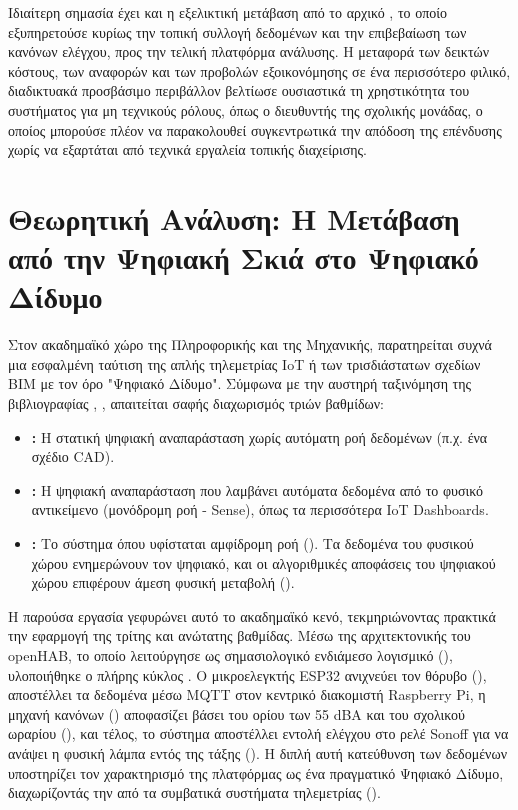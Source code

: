 Ιδιαίτερη σημασία έχει και η εξελικτική μετάβαση από το αρχικό , το οποίο εξυπηρετούσε κυρίως την τοπική συλλογή δεδομένων και την επιβεβαίωση των κανόνων ελέγχου, προς την τελική  πλατφόρμα ανάλυσης. Η μεταφορά των δεικτών κόστους, των αναφορών  και των προβολών εξοικονόμησης σε ένα περισσότερο φιλικό, διαδικτυακά προσβάσιμο περιβάλλον βελτίωσε ουσιαστικά τη χρηστικότητα του συστήματος για μη τεχνικούς ρόλους, όπως ο διευθυντής της σχολικής μονάδας, ο οποίος μπορούσε πλέον να παρακολουθεί συγκεντρωτικά την απόδοση της επένδυσης χωρίς να εξαρτάται από τεχνικά εργαλεία τοπικής διαχείρισης.

\section{Θεωρητική Ανάλυση: Η Μετάβαση από την Ψηφιακή Σκιά στο Ψηφιακό Δίδυμο}
Στον ακαδημαϊκό χώρο της Πληροφορικής και της Μηχανικής, παρατηρείται συχνά μια εσφαλμένη ταύτιση της απλής τηλεμετρίας IoT ή των τρισδιάστατων σχεδίων BIM με τον όρο "Ψηφιακό Δίδυμο". Σύμφωνα με την αυστηρή ταξινόμηση της βιβλιογραφίας \cite{Kritzinger2018}, \cite{Han2022}, απαιτείται σαφής διαχωρισμός τριών βαθμίδων:
\begin{itemize}
\item \textbf{:} Η στατική ψηφιακή αναπαράσταση χωρίς αυτόματη ροή δεδομένων (π.χ. ένα σχέδιο CAD).
\item \textbf{:} Η ψηφιακή αναπαράσταση που λαμβάνει αυτόματα δεδομένα από το φυσικό αντικείμενο (μονόδρομη ροή - Sense), όπως τα περισσότερα IoT Dashboards.
\item \textbf{:} Το σύστημα όπου υφίσταται αμφίδρομη ροή (). Τα δεδομένα του φυσικού χώρου ενημερώνουν τον ψηφιακό, και οι αλγοριθμικές αποφάσεις του ψηφιακού χώρου επιφέρουν άμεση φυσική μεταβολή ().
\end{itemize}

Η παρούσα εργασία γεφυρώνει αυτό το ακαδημαϊκό κενό, τεκμηριώνοντας πρακτικά την εφαρμογή της τρίτης και ανώτατης βαθμίδας. Μέσω της αρχιτεκτονικής του openHAB, το οποίο λειτούργησε ως σημασιολογικό ενδιάμεσο λογισμικό (), υλοποιήθηκε ο πλήρης κύκλος \textit{}. Ο μικροελεγκτής ESP32 ανιχνεύει τον θόρυβο (), αποστέλλει τα δεδομένα μέσω MQTT στον κεντρικό διακομιστή Raspberry Pi, η μηχανή κανόνων () αποφασίζει βάσει του ορίου των 55 dBA και του σχολικού ωραρίου (), και τέλος, το σύστημα αποστέλλει εντολή ελέγχου στο ρελέ Sonoff για να ανάψει η φυσική λάμπα εντός της τάξης (). Η διπλή αυτή κατεύθυνση των δεδομένων υποστηρίζει τον χαρακτηρισμό της πλατφόρμας ως ένα πραγματικό Ψηφιακό Δίδυμο, διαχωρίζοντάς την από τα συμβατικά συστήματα τηλεμετρίας ().

